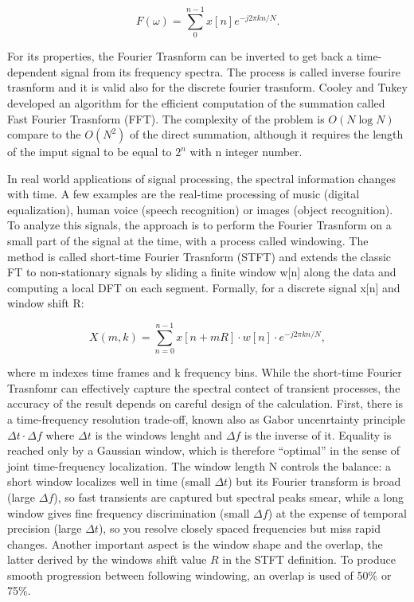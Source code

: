$$
F(\omega)=\sum_{0}^{n-1} x[n] e^{-j2\pi kn/N}.
$$

For its properties, the Fourier Trasnform can be inverted to get back a time-dependent signal from its frequency spectra. The process is called inverse fourire trasnform and it is valid also for the discrete fourier trasnform.
Cooley and Tukey developed an algorithm for the efficient computation of the summation called Fast Fourier Trasnform (FFT). The complexity of the problem is $O(N\log N)$ compare to the $O(N^2)$ of the direct summation, although it requires the length of the imput signal to be equal to $2^n$ with n integer number.

In real world applications of signal processing, the spectral information changes with time. A few examples are the real-time processing of music (digital equalization), human voice (speech recognition) or images (object recognition). To analyze this signals, the approach is to perform the Fourier Trasnform on a small part of the signal at the time, with a process called windowing. The method is called short-time Fourier Trasnform (STFT) and extends the classic FT to non-stationary signals by sliding a finite window w[n] along the data and computing a local DFT on each segment. Formally, for a discrete signal x[n] and window shift R:

$$
X(m,k) = \sum _{n=0} ^{n-1} x[n + mR] \cdot w[n] \cdot e^{-j2\pi kn/N},
$$

where m indexes time frames and k frequency bins. While the short-time Fourier Trasnfomr can effectively capture the spectral contect of transient processes, the accuracy of the result depends on careful design of the calculation. First, there is a time-frequency resolution trade-off, known also as Gabor uncenrtainty principle $\Delta t \cdot \Delta f $ where $\Delta t$ is the windows lenght and $\Delta f$ is the inverse of it. Equality is reached only by a Gaussian window, which is therefore “optimal” in the sense of joint time-frequency localization. The window length N controls the balance: a short window localizes well in time (small $\Delta t$) but its Fourier transform is broad (large $\Delta f$), so fast transients are captured but spectral peaks smear, while a long window gives fine frequency discrimination (small $\Delta f$) at the expense of temporal precision (large $\Delta t$), so you resolve closely spaced frequencies but miss rapid changes. Another important aspect is the window shape and the overlap, the latter derived by the windows shift value $R$ in the STFT definition.  To produce smooth progression between following windowing, an overlap is used of 50\% or 75\%. 

